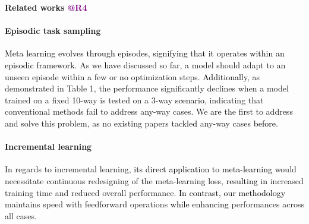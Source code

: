 \documentclass[letterpaper]{article} %
\newcommand{\nj}[1]{\textcolor{black}{#1}}
\newcommand{\yr}[1]{\textcolor{black}{#1}}
\newcommand{\rrrr}[1]{\textcolor{purple}{#1}}
\begin{document}
\noindent
\textbf{Related works \rrrr{@R4}} 
\paragraph{Episodic task sampling}
\yr{Meta learning evolves through episodes, signifying that it operates within an episodic framework.} %
As we \yr{have} discussed so far, a model should adapt to \nj{an} unseen episode within \nj{a} few or \nj{no} optimization steps. 
\yr{Additionally}, as demonstrated in Table 1, the performance significantly declines when a model trained on a fixed 10-way is tested on a 3-way \yr{scenario}, indicating that conventional methods fail to address any-way cases. We \nj{are} the first to address and solve this problem, as no existing papers tackle\yr{d} any-way cases \yr{before}. 
\paragraph{Incremental learning}
In regards to incremental learning, \yr{its direct application to meta-learning} %
would necessitate continuous redesigning of the meta-learning loss, \yr{resulting in} increased training time and reduced overall performance. \yr{In contrast, our methodology} maintains speed with feedforward operations \yr{while enhancing} performances across all cases.  


% 
\end{document}
